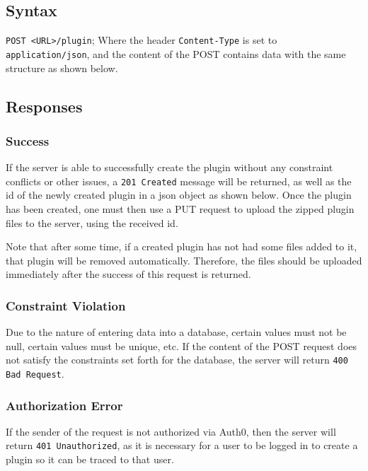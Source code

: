 \documentclass[a4paper, 12pt]{article}
\begin{document}
		\subsection{Syntax}
			\verb|POST <URL>/plugin|; \footnotesize{Where the header \verb|Content-Type| is set to \verb|application/json|, and the content of the POST contains data with the same structure as shown below.}

			

		\subsection{Responses}
			\subsubsection{Success}
				If the server is able to successfully create the plugin without any constraint conflicts or other issues, a \verb|201 Created| message will be returned, as well as the id of the newly created plugin in a json object as shown below. Once the plugin has been created, one must then use a PUT request to upload the zipped plugin files to the server, using the received id.

				

				Note that after some time, if a created plugin has not had some files added to it, that plugin will be removed automatically. Therefore, the files should be uploaded immediately after the success of this request is returned.

			\subsubsection{Constraint Violation}
				Due to the nature of entering data into a database, certain values must not be null, certain values must be unique, etc. If the content of the POST request does not satisfy the constraints set forth for the database, the server will return \verb|400 Bad Request|.

			\subsubsection{Authorization Error}
				If the sender of the request is not authorized via Auth0, then the server will return \verb|401 Unauthorized|, as it is necessary for a user to be logged in to create a plugin so it can be traced to that user.
\end{document}
